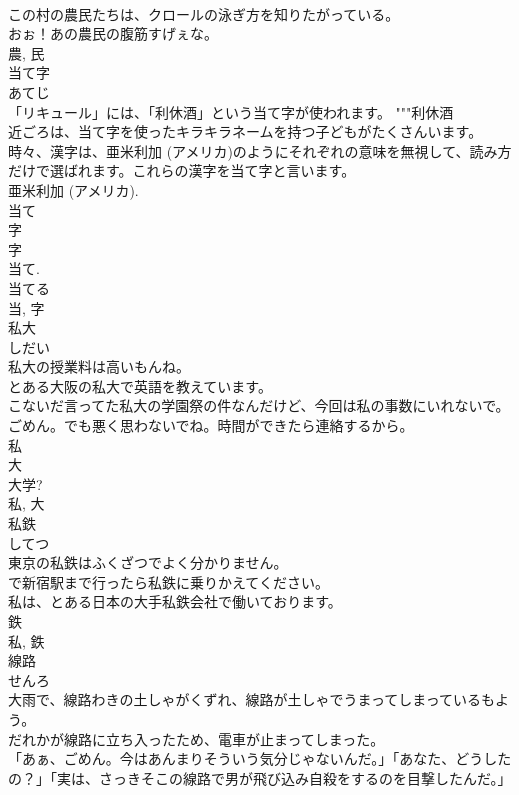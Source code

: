 \documentclass[8pt]{extreport}
\begin{document}
\begin{CJK}{UTF8}{min}
\\	この村の農民たちは、クロールの泳ぎ方を知りたがっている。	
\\	おぉ！あの農民の腹筋すげぇな。	
\\	農, 民	
\\	当て字	
\\	あてじ	
\\	「リキュール」には、「利休酒」という当て字が使われます。	"""利休酒
\\	近ごろは、当て字を使ったキラキラネームを持つ子どもがたくさんいます。	
\\	時々、漢字は、亜米利加 (アメリカ)のようにそれぞれの意味を無視して、読み方だけで選ばれます。これらの漢字を当て字と言います。	
\\	亜米利加 (アメリカ). 
\\	当て 
\\	字 
\\	字 
\\	当て. 
\\	当てる 
\\	当, 字	
\\	私大	
\\	しだい	
\\	私大の授業料は高いもんね。	
\\	とある大阪の私大で英語を教えています。	
\\	こないだ言ってた私大の学園祭の件なんだけど、今回は私の事数にいれないで。ごめん。でも悪く思わないでね。時間ができたら連絡するから。	
\\	私 
\\	大 
\\	大学? 
\\	私, 大	
\\	私鉄	
\\	してつ	
\\	東京の私鉄はふくざつでよく分かりません。	
\\	で新宿駅まで行ったら私鉄に乗りかえてください。	
\\	私は、とある日本の大手私鉄会社で働いております。	
\\	鉄 
\\	私, 鉄	
\\	線路	
\\	せんろ	
\\	大雨で、線路わきの土しゃがくずれ、線路が土しゃでうまってしまっているもよう。	
\\	だれかが線路に立ち入ったため、電車が止まってしまった。	
\\	「あぁ、ごめん。今はあんまりそういう気分じゃないんだ。」「あなた、どうしたの？」「実は、さっきそこの線路で男が飛び込み自殺をするのを目撃したんだ。」	

\end{CJK}
\end{document}
